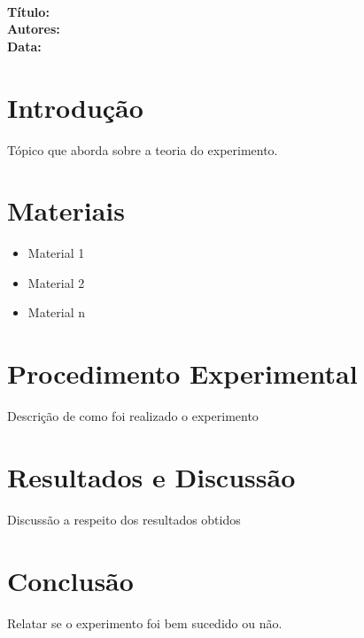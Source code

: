 \documentclass[a4paper, 12pt]{article}
\begin{document}
\textbf{ \\
  Título:  \\
  Autores: \\
  Data:} \\

\section{Introdução}
	Tópico que aborda sobre a teoria do experimento.

\section{Materiais}
	\begin{itemize}
		\item Material 1
		\item Material 2
		\item Material n		
	\end{itemize}

\section{Procedimento Experimental}
	Descrição de como foi realizado o experimento

\section{Resultados e Discussão}
	Discussão a respeito dos resultados obtidos

\section{Conclusão}
	Relatar se o experimento foi bem sucedido ou não.

\noindent
\end{document}
